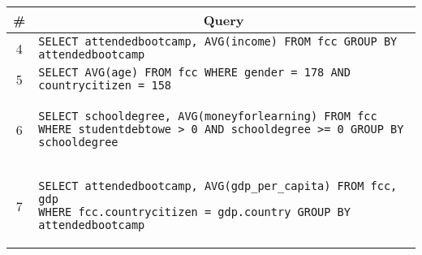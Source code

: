 \begin{tabular}{cl}
\toprule
\# & \multicolumn{1}{c}{Query} \\
\midrule
4 & \lstinline|SELECT attendedbootcamp, AVG(income) FROM fcc GROUP BY attendedbootcamp| {queryno} \label{q4} \\
5 & 
\lstinline|SELECT AVG(age) FROM fcc WHERE gender = 178 AND countrycitizen = 158|
{queryno} \label{q5} \\
6 & 
\begin{minipage}{6in}
\begin{lstlisting}[breaklines]
SELECT schooldegree, AVG(moneyforlearning) FROM fcc 
WHERE studentdebtowe > 0 AND schooldegree >= 0 GROUP BY schooldegree
\end{lstlisting}
\end{minipage}{queryno} \label{q6}\\
7 & 
\begin{minipage}{6in}
\begin{lstlisting}[breaklines]
SELECT attendedbootcamp, AVG(gdp_per_capita) FROM fcc, gdp 
WHERE fcc.countrycitizen = gdp.country GROUP BY attendedbootcamp
\end{lstlisting}
\end{minipage}{queryno} \label{q7}\\
\bottomrule
\end{tabular}
